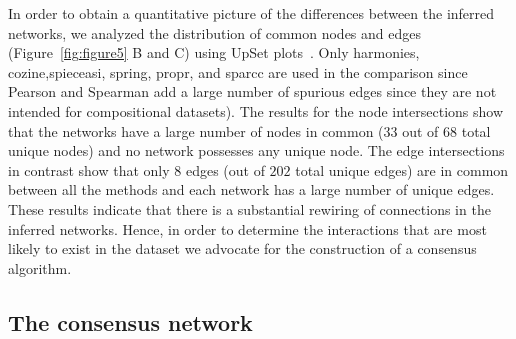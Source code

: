   In order to obtain a quantitative picture of the differences between the inferred networks, we analyzed the distribution of common nodes and edges (Figure~\ref{fig:figure5} B and C) using UpSet plots~\cite{Lex}.
  Only \ac{harmonies}, \ac{cozine},\ac{spieceasi}, \ac{spring}, propr, and \ac{sparcc} are used in the comparison since Pearson and Spearman add a large number of spurious edges since they are not intended for compositional datasets).
  The results for the node intersections show that the networks have a large number of nodes in common ($33$ out of $68$ total unique nodes) and no network possesses any unique node.
  The edge intersections in contrast show that only $8$ edges (out of $202$ total unique edges) are in common between all the methods and each network has a large number of unique edges.
  These results indicate that there is a substantial rewiring of connections in the inferred networks.
  Hence, in order to determine the interactions that are most likely to exist in the dataset we advocate for the construction of a consensus algorithm.

  \FloatBarrier

  \subsection*{The consensus network}

